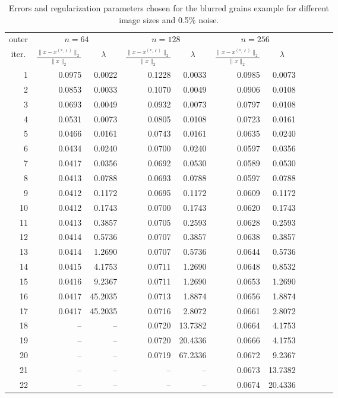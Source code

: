 \begin{table}[htp]
\caption{Errors and regularization parameters chosen for the blurred grains example for different image sizes and 0.5\% noise.}
\begin{center}
\begin{tabular}{|r|r|r|r|r|r|r|r|r|r|r|}
\hline
\multicolumn{1}{|c|}{outer} & \multicolumn{2}{c|}{$n = 64$} & \multicolumn{2}{c|}{$n = 128$} & \multicolumn{2}{c|}{$n = 256$} \\\cline{2-7}
\multicolumn{1}{|c|}{iter.} & \multicolumn{1}{c|}{$\frac{\|x - x^{(*,\ell)}\|_2}{\|x\|_2}$}& \multicolumn{1}{c|}{$\lambda$} & \multicolumn{1}{c|}{$\frac{\|x - x^{(*,\ell)}\|_2}{\|x\|_2}$} & \multicolumn{1}{c|}{$\lambda$} & \multicolumn{1}{c|}{$\frac{\|x - x^{(*,\ell)}\|_2}{\|x\|_2}$} & \multicolumn{1}{c|}{$\lambda$} \\
\hline
1 & 0.0975 & 0.0022 & 0.1228 & 0.0033 & 0.0985 & 0.0073 \\
2 & 0.0853 & 0.0033 & 0.1070 & 0.0049 & 0.0906 & 0.0108 \\
3 & 0.0693 & 0.0049 & 0.0932 & 0.0073 & 0.0797 & 0.0108 \\
4 & 0.0531 & 0.0073 & 0.0805 & 0.0108 & 0.0723 & 0.0161 \\
5 & 0.0466 & 0.0161 & 0.0743 & 0.0161 & 0.0635 & 0.0240 \\
6 & 0.0434 & 0.0240 & 0.0700 & 0.0240 & 0.0597 & 0.0356 \\
7 & 0.0417 & 0.0356 & 0.0692 & 0.0530 & 0.0589 & 0.0530 \\
8 & 0.0413 & 0.0788 & 0.0693 & 0.0788 & 0.0597 & 0.0788 \\
9 & 0.0412 & 0.1172 & 0.0695 & 0.1172 & 0.0609 & 0.1172 \\
10 & 0.0412 & 0.1743 & 0.0700 & 0.1743 & 0.0620 & 0.1743 \\
11 & 0.0413 & 0.3857 & 0.0705 & 0.2593 & 0.0628 & 0.2593 \\
12 & 0.0414 & 0.5736 & 0.0707 & 0.3857 & 0.0638 & 0.3857 \\
13 & 0.0414 & 1.2690 & 0.0707 & 0.5736 & 0.0644 & 0.5736 \\
14 & 0.0415 & 4.1753 & 0.0711 & 1.2690 & 0.0648 & 0.8532 \\
15 & 0.0416 & 9.2367 & 0.0711 & 1.2690 & 0.0653 & 1.2690 \\
16 & 0.0417 & 45.2035 & 0.0713 & 1.8874 & 0.0656 & 1.8874 \\
17 & 0.0417 & 45.2035 & 0.0716 & 2.8072 & 0.0661 & 2.8072 \\
18 & -- & -- & 0.0720 & 13.7382 & 0.0664 & 4.1753 \\
19 & -- & -- & 0.0720 & 20.4336 & 0.0666 & 4.1753 \\
20 & -- & -- & 0.0719 & 67.2336 & 0.0672 & 9.2367 \\
21 & -- & -- & -- & -- & 0.0673 & 13.7382 \\
22 & -- & -- & -- & -- & 0.0674 & 20.4336 \\
\hline
\end{tabular}
\end{center}
\label{tab:grains_blurring_errs_and_reg_params}
\end{table}%
